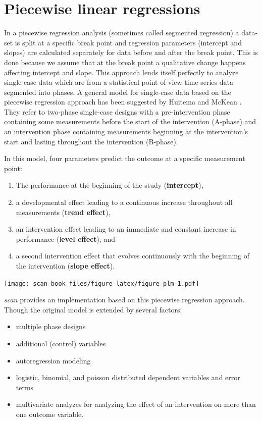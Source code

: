 \documentclass[
]{book}
\providecommand{\tightlist}{%
  \setlength{\itemsep}{0pt}\setlength{\parskip}{0pt}}
\begin{document}
\hypertarget{piecewise-linear-regressions}{%
\chapter{Piecewise linear regressions}\label{piecewise-linear-regressions}}

In a piecewise regression analysis (sometimes called segmented regression) a data-set is split at a specific break point and regression parameters (intercept and slopes) are calculated separately for data before and after the break point. This is done because we assume that at the break point a qualitative change happens affecting intercept and slope. This approach lends itself perfectly to analyze single-case data which are from a statistical point of view time-series data segmented into phases. A general model for single-case data based on the piecewise regression approach has been suggested by Huitema and McKean \citet{huitema_design_2000}. They refer to two-phase single-case designs with a pre-intervention phase containing some measurements before the start of the intervention (A-phase) and an intervention phase containing measurements beginning at the intervention's start and lasting throughout the intervention (B-phase).

In this model, four parameters predict the outcome at a specific measurement point:

\begin{enumerate}
\def\labelenumi{\arabic{enumi}.}
\item
  The performance at the beginning of the study (\textbf{intercept}),
\item
  a developmental effect leading to a continuous increase throughout all measurements (\textbf{trend effect}),
\item
  an intervention effect leading to an immediate and constant increase in performance (l\textbf{evel effect}), and
\item
  a second intervention effect that evolves continuously with the beginning of the intervention (\textbf{slope effect}).
\end{enumerate}

\texttt{[image: scan-book\_files/figure-latex/figure\_plm-1.pdf]}

\emph{scan} provides an implementation based on this piecewise regression approach. Though the original model is extended by several factors:

\begin{itemize}
\tightlist
\item
  multiple phase designs
\item
  additional (control) variables
\item
  autoregression modeling
\item
  logistic, binomial, and poisson distributed dependent variables and error terms
\item
  multivariate analyzes for analyzing the effect of an intervention on more than one outcome variable.
\end{itemize}
\end{document}
